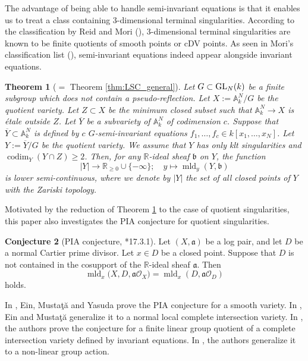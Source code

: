 \documentclass[a4paper,11pt]{amsart}
\newtheorem{thm}{Theorem}[section]
\theoremstyle{definition}
\newtheorem{conj}[thm]{Conjecture}
\theoremstyle{remark}
\begin{document}
The advantage of being able to handle semi-invariant equations is that it enables us to treat a class containing 3-dimensional terminal singularities. 
According to the classification by Reid and Mori (\cites{Rei80, Rei81, Mor85}), 
3-dimensional terminal singularities are known to be finite quotients of smooth points or cDV points. 
As seen in Mori's classification list (\cite{Mor85}), semi-invariant equations indeed appear alongside invariant equations.

\begin{thm}[{$=$ Theorem \ref{thm:LSC_general}}]\label{thm:LSC_intro}
Let $G \subset {\rm GL}_N(k)$ be a finite subgroup which does not contain a pseudo-reflection. 
Let $X := \mathbb{A}_k^N / G$ be the quotient variety. 
Let $Z \subset X$ be the minimum closed subset such that $\mathbb{A}_k^N \to X$ is \'{e}tale outside $Z$. 
Let $\overline{Y}$ be a subvariety of $\mathbb{A}_k^N$ of codimension $c$. 
Suppose that $\overline{Y} \subset \mathbb{A}_k^N$ is defined by $c$ $G$-semi-invariant equations 
$f_1, \ldots , f_c \in k[x_1, \ldots, x_N]$. 
Let $Y := \overline{Y}/ G$ be the quotient variety. 
We assume that $Y$ has only klt singularities and $\operatorname{codim} _Y (Y \cap Z) \ge 2$. 
Then, for any $\mathbb{R}$-ideal sheaf $\mathfrak{b}$ on $Y$, the function 
\[
|Y| \to \mathbb{R}_{\ge 0} \cup \{ - \infty \}; \quad y \mapsto \operatorname{mld}_y(Y,\mathfrak{b})
\]
is lower semi-continuous, where we denote by $|Y|$ the set of all closed points of $Y$ with the Zariski topology. 
\end{thm}

Motivated by the reduction of Theorem \ref{thm:LSC_intro} to the case of quotient singularities, 
this paper also investigates the PIA conjecture for quotient singularities.

\begin{conj}[PIA conjecture, {\cite{92}*{17.3.1}}]\label{conj:PIA}
Let $(X, \mathfrak{a})$ be a log pair, and let $D$  be a normal Cartier prime divisor.
Let $x \in D$ be a closed point. Suppose that $D$ is not contained in the cosupport of the $\mathbb{R}$-ideal sheaf $\mathfrak{a}$. 
Then 
\[
\operatorname{mld}_x \bigl( X,D, \mathfrak{a} \mathcal{O}_X \bigr) = \operatorname{mld}_x (D, \mathfrak{a} \mathcal{O}_D)
\]
holds. 
\end{conj}

In \cite{EMY03}, Ein, Musta\c{t}\u{a} and Yasuda prove the PIA conjecture for a smooth variety. 
In \cite{EM04}, Ein and Musta\c{t}\u{a} generalize it to a normal local complete intersection variety. 
In \cite{NS22}, the authors prove the conjecture for a finite linear group quotient of a complete intersection variety defined by invariant equations.
In \cite{NS2}, the authors generalize it to a non-linear group action.
\end{document}
